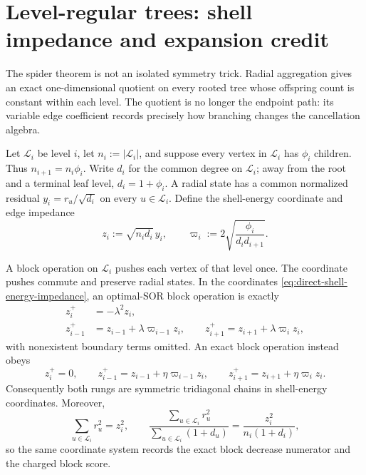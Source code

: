 \section{Level-regular trees: shell impedance and expansion credit}
\label{sec:direct-level-regular}

The spider theorem is not an isolated symmetry trick.  Radial aggregation
gives an exact one-dimensional quotient on every rooted tree whose offspring
count is constant within each level.  The quotient is no longer the endpoint
path: its variable edge coefficient records precisely how branching changes
the cancellation algebra.

Let $\mathcal L_i$ be level $i$, let $n_i:=|\mathcal L_i|$, and suppose every
vertex in $\mathcal L_i$ has $\phi_i$ children.  Thus
$n_{i+1}=n_i\phi_i$.  Write $d_i$ for the common degree on
$\mathcal L_i$; away from the root and a terminal leaf level,
$d_i=1+\phi_i$.  A radial state has a common normalized residual
$y_i=r_u/\sqrt{d_i}$ on every $u\in\mathcal L_i$.  Define the shell-energy
coordinate and edge impedance
\begin{equation}
 z_i:=\sqrt{n_i d_i}\,y_i,
 \qquad
 \varpi_i:=2\sqrt{\frac{\phi_i}{d_i d_{i+1}}}.
 \label{eq:direct-shell-energy-impedance}
\end{equation}

\begin{theorem}
\label{thm:direct-level-regular-quotient}
A block operation on $\mathcal L_i$ pushes each vertex of that level once.
The coordinate pushes commute and preserve radial states.  In the coordinates
\cref{eq:direct-shell-energy-impedance}, an optimal-SOR block operation is
exactly
\begin{align}
 z_i^+&=-\lambda^2z_i,
 \label{eq:direct-shell-sor-self}\\
 z_{i-1}^+&=z_{i-1}+\lambda\varpi_{i-1}z_i,
 \qquad
 z_{i+1}^+=z_{i+1}+\lambda\varpi_i z_i,
 \label{eq:direct-shell-sor-neighbors}
\end{align}
with nonexistent boundary terms omitted.  An exact block operation instead
obeys
\begin{equation}
 z_i^+=0,
 \qquad
 z_{i-1}^+=z_{i-1}+\eta\varpi_{i-1}z_i,
 \qquad
 z_{i+1}^+=z_{i+1}+\eta\varpi_i z_i.
 \label{eq:direct-shell-exact}
\end{equation}
Consequently both rungs are symmetric tridiagonal chains in shell-energy
coordinates.  Moreover,
\begin{equation}
 \sum_{u\in\mathcal L_i}r_u^2=z_i^2,
 \qquad
 \frac{\sum_{u\in\mathcal L_i}r_u^2}
      {\sum_{u\in\mathcal L_i}(1+d_u)}
 =\frac{z_i^2}{n_i(1+d_i)},
 \label{eq:direct-shell-score}
\end{equation}
so the same coordinate system records the exact block decrease numerator and
the charged block score.
\end{theorem}

